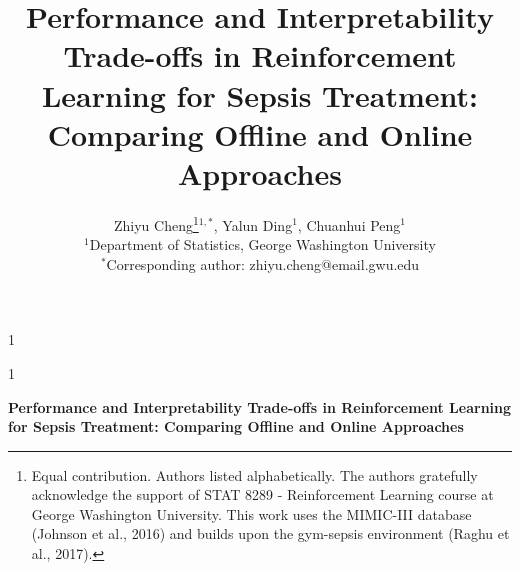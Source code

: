 \documentclass[11pt]{article}
\newcommand{\anon}{1}  %
\begin{document}
\def\spacingset#1{\renewcommand{\baselinestretch}{#1}\small\normalsize}
\spacingset{1}

\anon
{
  \title{\bf Performance and Interpretability Trade-offs in Reinforcement Learning for Sepsis Treatment: Comparing Offline and Online Approaches}
  \author{
    Zhiyu Cheng\thanks{Equal contribution. Authors listed alphabetically. The authors gratefully acknowledge the support of STAT 8289 - Reinforcement Learning course at George Washington University. This work uses the MIMIC-III database (Johnson et al., 2016) and builds upon the gym-sepsis environment (Raghu et al., 2017).}$^{1,*}$,
    Yalun Ding$^{1}$,
    Chuanhui Peng$^{1}$ \\
    $^{1}$Department of Statistics, George Washington University \\
    $^{*}$Corresponding author: zhiyu.cheng@email.gwu.edu
  }
  \maketitle
} \fi

\anon
{
  \bigskip
  \bigskip
  \bigskip
  \begin{center}
    {\LARGE\bf Performance and Interpretability Trade-offs in Reinforcement Learning for Sepsis Treatment: Comparing Offline and Online Approaches}
\end{center}
  \medskip
} \fi
\end{document}

